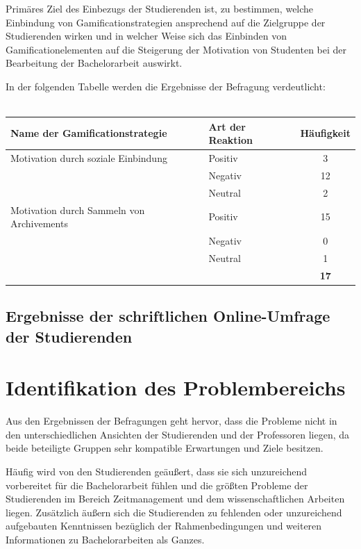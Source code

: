 \documentclass{scrreprt}
\begin{document}
\par Primäres Ziel des Einbezugs der Studierenden ist, zu bestimmen, welche Einbindung von Gamificationstrategien ansprechend auf die Zielgruppe der Studierenden wirken und in welcher Weise sich das Einbinden von Gamificationelementen auf die Steigerung der Motivation von Studenten bei der Bearbeitung der Bachelorarbeit auswirkt.\\

\par In der folgenden Tabelle werden die Ergebnisse der Befragung verdeutlicht:\\\\

\begin{tabularx}{\textwidth}{l|X|c}
	\hline
	\textbf{Name der Gamificationstrategie} & \textbf{Art der Reaktion} & 
	\textbf{Häufigkeit} \\ \hline
	Motivation durch soziale Einbindung & Positiv & 3 \\
	& Negativ & 12 \\
	& Neutral & 2 \\ \hline
	Motivation durch Sammeln von Archivements & Positiv & 15 \\
	& Negativ & 0 \\
	& Neutral & 1 \\ \hline
	&  & \textbf{17} \\
\end{tabularx}
\label{tab:einbezugStudierende}

\subsection{Ergebnisse der schriftlichen Online-Umfrage der Studierenden}

\newpage
\section{Identifikation des Problembereichs}
\par Aus den Ergebnissen der Befragungen geht hervor, dass die Probleme nicht in den unterschiedlichen Ansichten der Studierenden und der Professoren liegen, da beide beteiligte Gruppen sehr kompatible Erwartungen und Ziele besitzen.\\

\par Häufig wird von den Studierenden geäußert, dass sie sich unzureichend vorbereitet für die Bachelorarbeit fühlen und die größten Probleme der Studierenden im Bereich Zeitmanagement und dem wissenschaftlichen Arbeiten liegen. Zusätzlich äußern sich die Studierenden zu fehlenden oder unzureichend aufgebauten Kenntnissen bezüglich der Rahmenbedingungen und weiteren Informationen zu Bachelorarbeiten als Ganzes.\\
\end{document}
